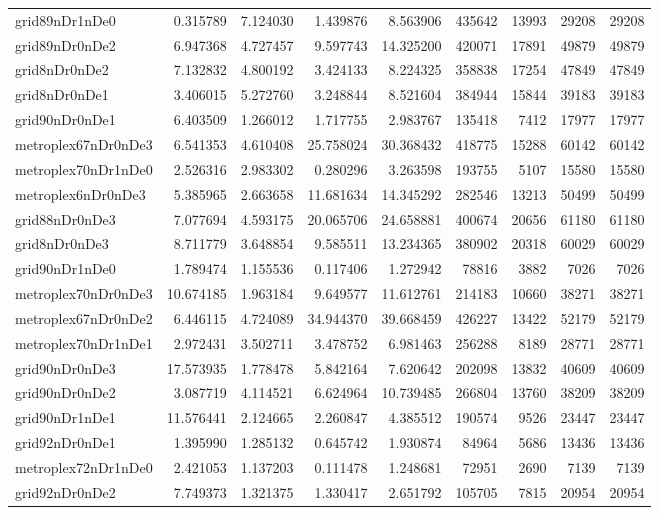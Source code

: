 \begin{longtable}{|l|r|r|r|r|r|r|r|r|}
grid89nDr1nDe0 & 0.315789 & 7.124030 & 1.439876 & 8.563906 & 435642 & 13993 & 29208 & 29208 \\
grid89nDr0nDe2 & 6.947368 & 4.727457 & 9.597743 & 14.325200 & 420071 & 17891 & 49879 & 49879 \\
grid8nDr0nDe2 & 7.132832 & 4.800192 & 3.424133 & 8.224325 & 358838 & 17254 & 47849 & 47849 \\
grid8nDr0nDe1 & 3.406015 & 5.272760 & 3.248844 & 8.521604 & 384944 & 15844 & 39183 & 39183 \\
grid90nDr0nDe1 & 6.403509 & 1.266012 & 1.717755 & 2.983767 & 135418 & 7412 & 17977 & 17977 \\
metroplex67nDr0nDe3 & 6.541353 & 4.610408 & 25.758024 & 30.368432 & 418775 & 15288 & 60142 & 60142 \\
metroplex70nDr1nDe0 & 2.526316 & 2.983302 & 0.280296 & 3.263598 & 193755 & 5107 & 15580 & 15580 \\
metroplex6nDr0nDe3 & 5.385965 & 2.663658 & 11.681634 & 14.345292 & 282546 & 13213 & 50499 & 50499 \\
grid88nDr0nDe3 & 7.077694 & 4.593175 & 20.065706 & 24.658881 & 400674 & 20656 & 61180 & 61180 \\
grid8nDr0nDe3 & 8.711779 & 3.648854 & 9.585511 & 13.234365 & 380902 & 20318 & 60029 & 60029 \\
grid90nDr1nDe0 & 1.789474 & 1.155536 & 0.117406 & 1.272942 & 78816 & 3882 & 7026 & 7026 \\
metroplex70nDr0nDe3 & 10.674185 & 1.963184 & 9.649577 & 11.612761 & 214183 & 10660 & 38271 & 38271 \\
metroplex67nDr0nDe2 & 6.446115 & 4.724089 & 34.944370 & 39.668459 & 426227 & 13422 & 52179 & 52179 \\
metroplex70nDr1nDe1 & 2.972431 & 3.502711 & 3.478752 & 6.981463 & 256288 & 8189 & 28771 & 28771 \\
grid90nDr0nDe3 & 17.573935 & 1.778478 & 5.842164 & 7.620642 & 202098 & 13832 & 40609 & 40609 \\
grid90nDr0nDe2 & 3.087719 & 4.114521 & 6.624964 & 10.739485 & 266804 & 13760 & 38209 & 38209 \\
grid90nDr1nDe1 & 11.576441 & 2.124665 & 2.260847 & 4.385512 & 190574 & 9526 & 23447 & 23447 \\
grid92nDr0nDe1 & 1.395990 & 1.285132 & 0.645742 & 1.930874 & 84964 & 5686 & 13436 & 13436 \\
metroplex72nDr1nDe0 & 2.421053 & 1.137203 & 0.111478 & 1.248681 & 72951 & 2690 & 7139 & 7139 \\
grid92nDr0nDe2 & 7.749373 & 1.321375 & 1.330417 & 2.651792 & 105705 & 7815 & 20954 & 20954 \\

\end{longtable}
